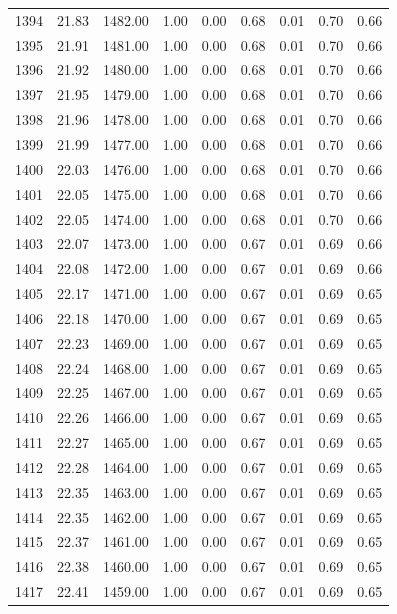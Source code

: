 \documentclass{article}\usepackage[]{graphicx}\usepackage[]{color}
\begin{document}
\begin{longtable}{rrrrrrrrr}
  1394 & 21.83 & 1482.00 & 1.00 & 0.00 & 0.68 & 0.01 & 0.70 & 0.66 \\ 
  1395 & 21.91 & 1481.00 & 1.00 & 0.00 & 0.68 & 0.01 & 0.70 & 0.66 \\ 
  1396 & 21.92 & 1480.00 & 1.00 & 0.00 & 0.68 & 0.01 & 0.70 & 0.66 \\ 
  1397 & 21.95 & 1479.00 & 1.00 & 0.00 & 0.68 & 0.01 & 0.70 & 0.66 \\ 
  1398 & 21.96 & 1478.00 & 1.00 & 0.00 & 0.68 & 0.01 & 0.70 & 0.66 \\ 
  1399 & 21.99 & 1477.00 & 1.00 & 0.00 & 0.68 & 0.01 & 0.70 & 0.66 \\ 
  1400 & 22.03 & 1476.00 & 1.00 & 0.00 & 0.68 & 0.01 & 0.70 & 0.66 \\ 
  1401 & 22.05 & 1475.00 & 1.00 & 0.00 & 0.68 & 0.01 & 0.70 & 0.66 \\ 
  1402 & 22.05 & 1474.00 & 1.00 & 0.00 & 0.68 & 0.01 & 0.70 & 0.66 \\ 
  1403 & 22.07 & 1473.00 & 1.00 & 0.00 & 0.67 & 0.01 & 0.69 & 0.66 \\ 
  1404 & 22.08 & 1472.00 & 1.00 & 0.00 & 0.67 & 0.01 & 0.69 & 0.66 \\ 
  1405 & 22.17 & 1471.00 & 1.00 & 0.00 & 0.67 & 0.01 & 0.69 & 0.65 \\ 
  1406 & 22.18 & 1470.00 & 1.00 & 0.00 & 0.67 & 0.01 & 0.69 & 0.65 \\ 
  1407 & 22.23 & 1469.00 & 1.00 & 0.00 & 0.67 & 0.01 & 0.69 & 0.65 \\ 
  1408 & 22.24 & 1468.00 & 1.00 & 0.00 & 0.67 & 0.01 & 0.69 & 0.65 \\ 
  1409 & 22.25 & 1467.00 & 1.00 & 0.00 & 0.67 & 0.01 & 0.69 & 0.65 \\ 
  1410 & 22.26 & 1466.00 & 1.00 & 0.00 & 0.67 & 0.01 & 0.69 & 0.65 \\ 
  1411 & 22.27 & 1465.00 & 1.00 & 0.00 & 0.67 & 0.01 & 0.69 & 0.65 \\ 
  1412 & 22.28 & 1464.00 & 1.00 & 0.00 & 0.67 & 0.01 & 0.69 & 0.65 \\ 
  1413 & 22.35 & 1463.00 & 1.00 & 0.00 & 0.67 & 0.01 & 0.69 & 0.65 \\ 
  1414 & 22.35 & 1462.00 & 1.00 & 0.00 & 0.67 & 0.01 & 0.69 & 0.65 \\ 
  1415 & 22.37 & 1461.00 & 1.00 & 0.00 & 0.67 & 0.01 & 0.69 & 0.65 \\ 
  1416 & 22.38 & 1460.00 & 1.00 & 0.00 & 0.67 & 0.01 & 0.69 & 0.65 \\ 
  1417 & 22.41 & 1459.00 & 1.00 & 0.00 & 0.67 & 0.01 & 0.69 & 0.65 \\ 

\end{longtable}
\end{document}
